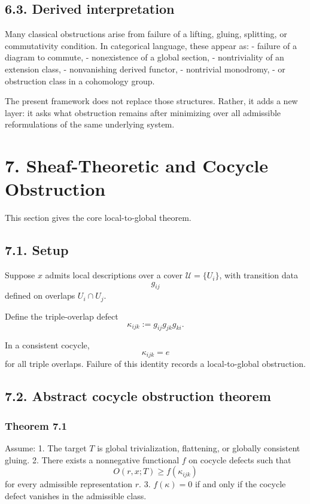 \documentclass[
]{article}
\begin{document}
\subsection{6.3. Derived interpretation}\label{derived-interpretation}

Many classical obstructions arise from failure of a lifting, gluing,
splitting, or commutativity condition. In categorical language, these
appear as: - failure of a diagram to commute, - nonexistence of a global
section, - nontriviality of an extension class, - nonvanishing derived
functor, - nontrivial monodromy, - or obstruction class in a cohomology
group.

The present framework does not replace those structures. Rather, it adds
a new layer: it asks what obstruction remains after minimizing over all
admissible reformulations of the same underlying system.

\section{7. Sheaf-Theoretic and Cocycle
Obstruction}\label{sheaf-theoretic-and-cocycle-obstruction}

This section gives the core local-to-global theorem.

\subsection{7.1. Setup}\label{setup}

Suppose \(x\) admits local descriptions over a cover
\(\mathcal{U} = \{U_i\}\), with transition data \[
g_{ij}
\] defined on overlaps \(U_i \cap U_j\).

Define the triple-overlap defect \[
\kappa_{ijk} := g_{ij} g_{jk} g_{ki}.
\]

In a consistent cocycle, \[
\kappa_{ijk} = e
\] for all triple overlaps. Failure of this identity records a
local-to-global obstruction.

\subsection{7.2. Abstract cocycle obstruction
theorem}\label{abstract-cocycle-obstruction-theorem}

\subsubsection{Theorem 7.1}\label{theorem-7.1}

Assume: 1. The target \(T\) is global trivialization, flattening, or
globally consistent gluing. 2. There exists a nonnegative functional
\(f\) on cocycle defects such that \[
   O(r,x;T) \ge f(\kappa_{ijk})
   \] for every admissible representation \(r\). 3. \(f(\kappa)=0\) if
and only if the cocycle defect vanishes in the admissible class.
\end{document}
